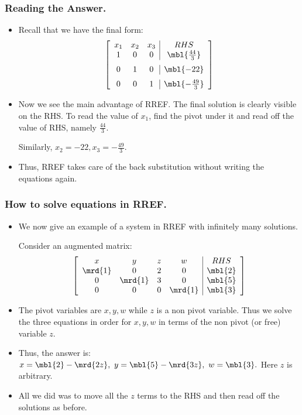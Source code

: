 \begin{frame}%
  \frametitle{Reading the Answer.}
  \begin{itemize}%
\item Recall that we have the final form:
$$\left[ \begin {array}{ccc|c}
x_1 & x_2 & x_3 & RHS\\
1&0&0&\mbl{\frac{44}{3}}\\\noalign{\medskip}
0&1&0&\mbl{-22}\\\noalign{\medskip}
0&0&1&\mbl{-\frac {49}{3}}\end {array} \right]
$$

\item Now we see the main advantage of RREF.
The final solution is clearly visible on the RHS. To read the value of
$x_1$, find the pivot under it and read off the value of RHS, namely
$\frac{44}{3}$.

Similarly, $x_2=-22,x_3=-\frac{49}{3}$.

\item Thus, RREF takes care of the back substitution without writing the
equations again.


\end{itemize}
\end{frame}

\begin{frame}%
  \frametitle{How to solve equations in RREF.}
  \begin{itemize}%
 
\item We now give an example of a system in RREF with infinitely many
solutions.

Consider an augmented matrix:
$$\left[
\begin{array}{cccc|c}
x & y & z & w & RHS\\
\mrd{1} & 0 & 2 & 0 & \mbl{2}\\
0 & \mrd{1} & 3 & 0 & \mbl{5}\\
0 & 0 & 0 & \mrd{1} & \mbl{3}\\
\end{array}
\right]
$$
\item The pivot variables are $x,y,w$ while $z$ is a non pivot variable.
Thus we solve the three equations in order for $x,y,w$ in terms of the
non pivot (or free) variable $z$.

\item Thus, the answer is:
$\displaystyle x=\mbl{2} - \mrd{2z},~ y= \mbl{5} - \mrd{3z},~ w = \mbl{3}.$
Here $z$ is arbitrary.

\item All we did was to move all the $z$ terms to the RHS and then 
read off the solutions as before.
\end{itemize}
\end{frame}

